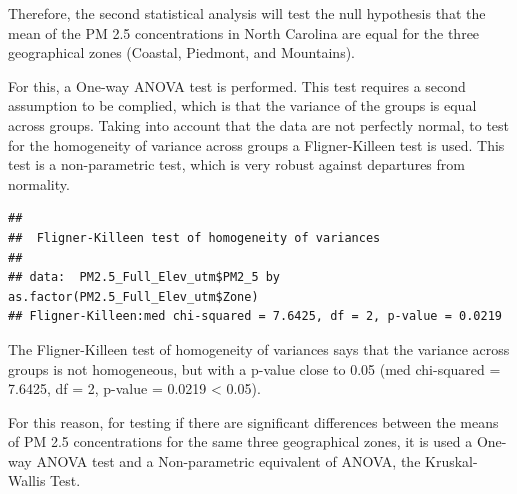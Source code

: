 \documentclass[12pt,]{article}
\newenvironment{Shaded}{\begin{snugshade}}{\end{snugshade}}
\newcommand{\KeywordTok}[1]{\textcolor[rgb]{0.13,0.29,0.53}{\textbf{#1}}}
\newcommand{\DecValTok}[1]{\textcolor[rgb]{0.00,0.00,0.81}{#1}}
\newcommand{\FloatTok}[1]{\textcolor[rgb]{0.00,0.00,0.81}{#1}}
\newcommand{\StringTok}[1]{\textcolor[rgb]{0.31,0.60,0.02}{#1}}
\newcommand{\OperatorTok}[1]{\textcolor[rgb]{0.81,0.36,0.00}{\textbf{#1}}}
\newcommand{\NormalTok}[1]{#1}
\begin{document}
Therefore, the second statistical analysis will test the null hypothesis
that the mean of the PM 2.5 concentrations in North Carolina are equal
for the three geographical zones (Coastal, Piedmont, and Mountains).

For this, a One-way ANOVA test is performed. This test requires a second
assumption to be complied, which is that the variance of the groups is
equal across groups. Taking into account that the data are not perfectly
normal, to test for the homogeneity of variance across groups a
Fligner-Killeen test is used. This test is a non-parametric test, which
is very robust against departures from normality.

\begin{Shaded}
\end{Shaded}

\begin{verbatim}
## 
##  Fligner-Killeen test of homogeneity of variances
## 
## data:  PM2.5_Full_Elev_utm$PM2_5 by as.factor(PM2.5_Full_Elev_utm$Zone)
## Fligner-Killeen:med chi-squared = 7.6425, df = 2, p-value = 0.0219
\end{verbatim}

The Fligner-Killeen test of homogeneity of variances says that the
variance across groups is not homogeneous, but with a p-value close to
0.05 (med chi-squared = 7.6425, df = 2, p-value = 0.0219 \textless{}
0.05).

For this reason, for testing if there are significant differences
between the means of PM 2.5 concentrations for the same three
geographical zones, it is used a One-way ANOVA test and a Non-parametric
equivalent of ANOVA, the Kruskal-Wallis Test.

\begin{Shaded}
\end{Shaded}
\end{document}
